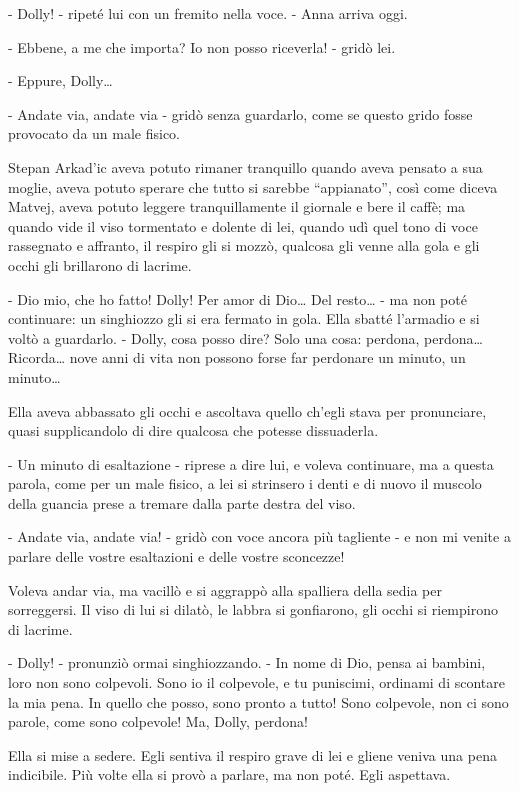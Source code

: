 - Dolly! - ripeté lui con un fremito nella voce. - Anna arriva oggi. 

- Ebbene, a me che importa? Io non posso riceverla! - gridò lei. 

- Eppure, Dolly\ldots{} 

- Andate via, andate via - gridò senza guardarlo, come se questo grido fosse provocato da un male fisico. 

Stepan Arkad'ic aveva potuto rimaner tranquillo quando aveva pensato a sua moglie, aveva potuto sperare che tutto si sarebbe ``appianato'', così come diceva Matvej, aveva potuto leggere tranquillamente il giornale e bere il caffè; ma quando vide il viso tormentato e dolente di lei, quando udì quel tono di voce rassegnato e affranto, il respiro gli si mozzò, qualcosa gli venne alla gola e gli occhi gli brillarono di lacrime. 

- Dio mio, che ho fatto! Dolly! Per amor di Dio\ldots{} Del resto\ldots{} - ma non poté continuare: un singhiozzo gli si era fermato in gola. Ella sbatté l'armadio e si voltò a guardarlo. - Dolly, cosa posso dire? Solo una cosa: perdona, perdona\ldots{} Ricorda\ldots{} nove anni di vita non possono forse far perdonare un minuto, un minuto\ldots{} 

Ella aveva abbassato gli occhi e ascoltava quello ch'egli stava per pronunciare, quasi supplicandolo di dire qualcosa che potesse dissuaderla. 

- Un minuto di esaltazione - riprese a dire lui, e voleva continuare, ma a questa parola, come per un male fisico, a lei si strinsero i denti e di nuovo il muscolo della guancia prese a tremare dalla parte destra del viso. 

- Andate via, andate via! - gridò con voce ancora più tagliente - e non mi venite a parlare delle vostre esaltazioni e delle vostre sconcezze! 

Voleva andar via, ma vacillò e si aggrappò alla spalliera della sedia per sorreggersi. Il viso di lui si dilatò, le labbra si gonfiarono, gli occhi si riempirono di lacrime. 

- Dolly! - pronunziò ormai singhiozzando. - In nome di Dio, pensa ai bambini, loro non sono colpevoli. Sono io il colpevole, e tu puniscimi, ordinami di scontare la mia pena. In quello che posso, sono pronto a tutto! Sono colpevole, non ci sono parole, come sono colpevole! Ma, Dolly, perdona! 

Ella si mise a sedere. Egli sentiva il respiro grave di lei e gliene veniva una pena indicibile. Più volte ella si provò a parlare, ma non poté. Egli aspettava. 

